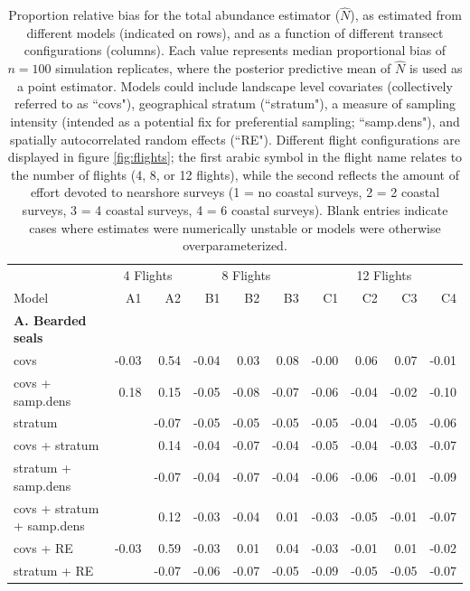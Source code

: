 \documentclass[]{rsos}%
\begin{document}
\begin{table}[ht]
\caption{Proportion relative bias for the total abundance estimator ($\hat{N}$), as estimated from different models (indicated on rows), and as a function of different transect configurations (columns).  Each value represents median proportional bias of $n=100$ simulation replicates, where the posterior predictive mean of $\hat{N}$ is used as a point estimator.  Models could include landscape level covariates (collectively referred to as ``covs"), geographical stratum (``stratum"), a measure of sampling intensity (intended as a potential fix for preferential sampling; ``samp.dens"), and spatially autocorrelated random effects (``RE").  Different flight configurations are displayed in figure \ref{fig:flights}; the first arabic symbol in the flight name relates to the number of flights (4, 8, or 12 flights), while the second reflects the amount of effort devoted to nearshore surveys (1 = no coastal surveys, 2 = 2 coastal surveys, 3 = 4 coastal surveys, 4 = 6 coastal surveys).  Blank entries indicate cases where estimates were numerically unstable or models were otherwise overparameterized.
}
\label{tab:bias}
\centering
\begin{tabular}{lrrrrrrrrr}
  \hline
   & \multicolumn{2}{c}{4 Flights} & \multicolumn{3}{c}{8 Flights} & \multicolumn{4}{c}{12 Flights} \\
   \cmidrule(lr){2-3} \cmidrule(lr){4-6} \cmidrule(lr){7-10}
Model & A1 & A2 & B1 & B2 & B3 & C1 & C2 & C3 & C4 \\
  \hline
  {\bf A. Bearded seals} & & & & & & & & & \\
covs & -0.03 & 0.54 & -0.04 & 0.03 & 0.08 & -0.00 & 0.06 & 0.07 & -0.01 \\
  covs + samp.dens & 0.18 & 0.15 & -0.05 & -0.08 & -0.07 & -0.06 & -0.04 & -0.02 & -0.10 \\
  stratum &  & -0.07 & -0.05 & -0.05 & -0.05 & -0.05 & -0.04 & -0.05 & -0.06 \\
  covs + stratum &  & 0.14 & -0.04 & -0.07 & -0.04 & -0.05 & -0.04 & -0.03 & -0.07 \\
  stratum + samp.dens &  & -0.07 & -0.04 & -0.07 & -0.04 & -0.06 & -0.06 & -0.01 & -0.09 \\
  covs + stratum + samp.dens &  & 0.12 & -0.03 & -0.04 & 0.01 & -0.03 & -0.05 & -0.01 & -0.07 \\
  covs + RE & -0.03 & 0.59 & -0.03 & 0.01 & 0.04 & -0.03 & -0.01 & 0.01 & -0.02 \\
  stratum + RE &  & -0.07 & -0.06 & -0.07 & -0.05 & -0.09 & -0.05 & -0.05 & -0.07 \\

\end{tabular}
\end{table}
\end{document}
